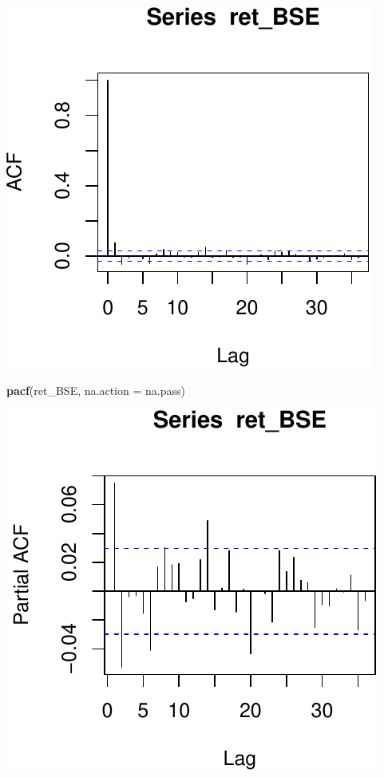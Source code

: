 \documentclass[11pt,]{article}
\newenvironment{Shaded}{\begin{snugshade}}{\end{snugshade}}
\newcommand{\KeywordTok}[1]{\textcolor[rgb]{0.13,0.29,0.53}{\textbf{#1}}}
\newcommand{\DataTypeTok}[1]{\textcolor[rgb]{0.13,0.29,0.53}{#1}}
\newcommand{\NormalTok}[1]{#1}
\begin{document}
\begin{center}\includegraphics{FMC_T4_PhD_ARMA_GARCH_files/figure-latex/BSE_fit_ARMA_GARCH_ACF-1} \end{center}

\begin{Shaded}
\begin{Highlighting}[]
\KeywordTok{pacf}\NormalTok{(ret_BSE, }\DataTypeTok{na.action =}\NormalTok{ na.pass)}
\end{Highlighting}
\end{Shaded}

\begin{center}\includegraphics{FMC_T4_PhD_ARMA_GARCH_files/figure-latex/BSE_fit_ARMA_GARCH_ACF-2} \end{center}
\end{document}
